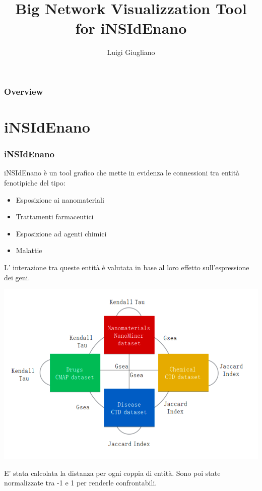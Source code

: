 \documentclass{beamer}
\title{Big Network Visualizzation Tool for iNSIdEnano}
\author{Luigi Giugliano}
\institute{Universit\'a degli studi di Salerno}
\begin{document}
\begin{frame}
   \maketitle
\end{frame}

\begin{frame}
  \frametitle{Overview}
  \footnotesize \tableofcontents
\end{frame}



\section{iNSIdEnano}
\begin{frame}
\frametitle{iNSIdEnano}
iNSIdEnano è un tool grafico che mette in evidenza le connessioni tra entità fenotipiche del tipo:
\begin{itemize}
\item Esposizione ai nanomateriali
\item Trattamenti farmaceutici
\item Esposizione ad agenti chimici
\item Malattie
\end{itemize}
L' interazione tra queste entità è valutata in base al loro effetto sull'espressione dei geni.
\end{frame}

\begin{frame}
\begin{center}
\includegraphics[scale=0.27]{img/OverviewGraph.png}
\end{center}
E' stata calcolata la distanza per ogni coppia di entità. Sono poi state normalizzate tra -1 e 1 per renderle confrontabili.
\end{frame}
\end{document}
